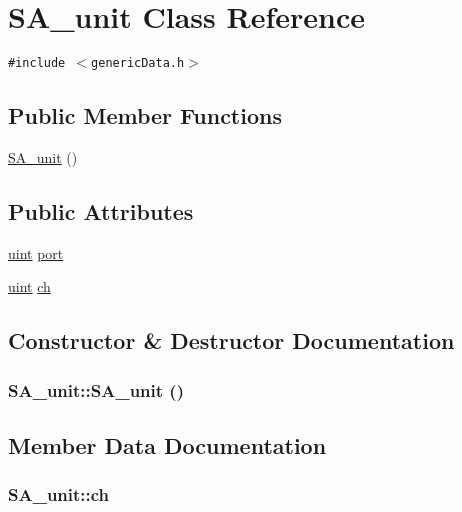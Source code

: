 \hypertarget{classSA__unit}{
\section{SA\_\-unit Class Reference}
\label{classSA__unit}
}
{\tt \#include $<$genericData.h$>$}

\subsection*{Public Member Functions}
\begin{CompactItemize}
\item 
\hyperlink{classSA__unit_3eff7d0c584bc8bd2d1154c5bd35648f}{SA\_\-unit} ()
\end{CompactItemize}
\subsection*{Public Attributes}
\begin{CompactItemize}
\item 
\hyperlink{outputBuffer_8h_91ad9478d81a7aaf2593e8d9c3d06a14}{uint} \hyperlink{classSA__unit_f2bd521c837d03abb97d9c8d0e037c0d}{port}
\item 
\hyperlink{outputBuffer_8h_91ad9478d81a7aaf2593e8d9c3d06a14}{uint} \hyperlink{classSA__unit_07b14e6d4de745f64d8715563f31a2e5}{ch}
\end{CompactItemize}


\subsection{Constructor \& Destructor Documentation}
\hypertarget{classSA__unit_3eff7d0c584bc8bd2d1154c5bd35648f}{
\subsubsection[{SA\_\-unit}]{\setlength{\rightskip}{0pt plus 5cm}SA\_\-unit::SA\_\-unit ()}}
\label{classSA__unit_3eff7d0c584bc8bd2d1154c5bd35648f}




\subsection{Member Data Documentation}
\hypertarget{classSA__unit_07b14e6d4de745f64d8715563f31a2e5}{
\subsubsection[{ch}]{ {\bf SA\_\-unit::ch}}}
\label{classSA__unit_07b14e6d4de745f64d8715563f31a2e5}


